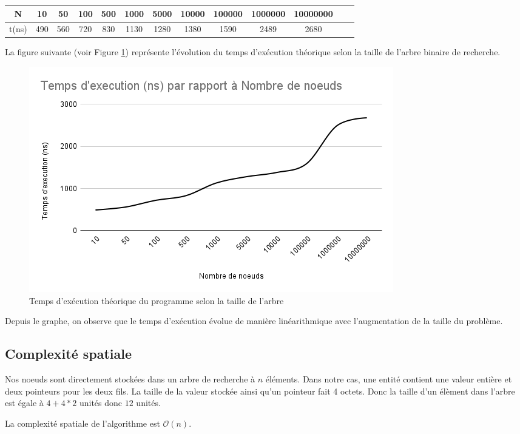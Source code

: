 \small
\begin{center}
\begin{tabular}{| c | c | c | c | c | c | c | c | c | c | c | c | c |}
    \hline
    N &  10 & 50 & 100 & 500 & 1000 & 5000 & 10000 & 100000 & 1000000 & 10000000 \\
    \hline
    t(ns) & 490 & 560 & 720 & 830 & 1130 & 1280 & 1380 & 1590 &  2489 & 2680  \\
    
    \hline
\end{tabular}  
\end{center}

La figure suivante (voir Figure \ref{fig:temps_exec_abr_theo}) représente l'évolution du temps d'exécution théorique selon la taille de l'arbre binaire de recherche.

\begin{figure}[H]
    \centering
        \includegraphics[scale=0.7]{./ressources/exe theo.png}
        \caption{Temps d'exécution théorique du programme selon la taille de l'arbre}
    \label{fig:temps_exec_abr_theo}
\end{figure} 

Depuis le graphe,  on observe que le temps d'exécution évolue de manière linéarithmique avec l'augmentation de la taille du problème.

\subsection{Complexité spatiale}

\par
Nos noeuds sont directement stockées dans un arbre de recherche à $n$ éléments. Dans notre cas, une entité contient une valeur entière et deux pointeurs pour les deux fils. La taille de la valeur stockée ainsi qu'un pointeur fait 4 octets. Donc la taille d'un élèment dans l'arbre est égale à $4+ 4*2$ unités donc $12$ unités.
\par
La complexité spatiale de l’algorithme est $\mathcal{O}(n)$.
\par

